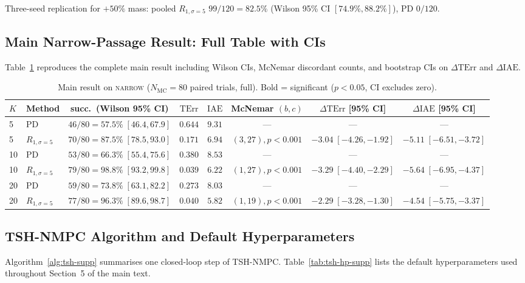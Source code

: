 \documentclass[11pt,a4paper]{article}
\newcommand{\Nm}{N_{\mathrm{MC}}}
\newcommand{\TErr}{\mathrm{TErr}}
\newcommand{\IAE}{\mathrm{IAE}}
\begin{document}
Three-seed replication for $+50\%$ mass: pooled $R_{1,\sigma=5}$
$99/120 = 82.5\%$ (Wilson 95\% CI $[74.9\%, 88.2\%]$), PD $0/120$.

\subsection{Main Narrow-Passage Result: Full Table with CIs}

Table~\ref{tab:s1-main-full} reproduces the complete main result
including Wilson CIs, McNemar discordant counts, and bootstrap CIs
on $\Delta\TErr$ and $\Delta\IAE$.

\begin{table}[h]
\centering
\caption{Main result on \textsc{narrow} ($\Nm = 80$ paired trials,
full). Bold = significant ($p < 0.05$, CI excludes zero).}\label{tab:s1-main-full}
{\small
\begin{tabular}{llcccccc}
\toprule
$K$ & Method & succ.\ (Wilson 95\% CI) & $\TErr$ & $\IAE$ &
McNemar $(b,c)$ & $\Delta\TErr$ [95\% CI] & $\Delta\IAE$ [95\% CI] \\
\midrule
5  & PD & $46/80=57.5\%\;[46.4,67.9]$ & $0.644$ & $9.31$ & --- & --- & --- \\
5  & $R_{1,\sigma=5}$ & $70/80=87.5\%\;[78.5,93.0]$ & $0.171$ & $6.94$ &
$(3,27),p{<}0.001$ & $-3.04\;[-4.26,-1.92]$ & $-5.11\;[-6.51,-3.72]$ \\
\midrule
10 & PD & $53/80=66.3\%\;[55.4,75.6]$ & $0.380$ & $8.53$ & --- & --- & --- \\
10 & $R_{1,\sigma=5}$ & $79/80=98.8\%\;[93.2,99.8]$ & $0.039$ & $6.22$ &
$(1,27),p{<}0.001$ & $-3.29\;[-4.40,-2.29]$ & $-5.64\;[-6.95,-4.37]$ \\
\midrule
20 & PD & $59/80=73.8\%\;[63.1,82.2]$ & $0.273$ & $8.03$ & --- & --- & --- \\
20 & $R_{1,\sigma=5}$ & $77/80=96.3\%\;[89.6,98.7]$ & $0.040$ & $5.82$ &
$(1,19),p{<}0.001$ & $-2.29\;[-3.28,-1.30]$ & $-4.54\;[-5.75,-3.37]$ \\
\bottomrule
\end{tabular}}
\end{table}

\subsection{TSH-NMPC Algorithm and Default Hyperparameters}

Algorithm~\ref{alg:tsh-supp} summarises one closed-loop step of
TSH-NMPC. Table~\ref{tab:tsh-hp-supp} lists the default
hyperparameters used throughout Section~5 of the main text.
\end{document}
